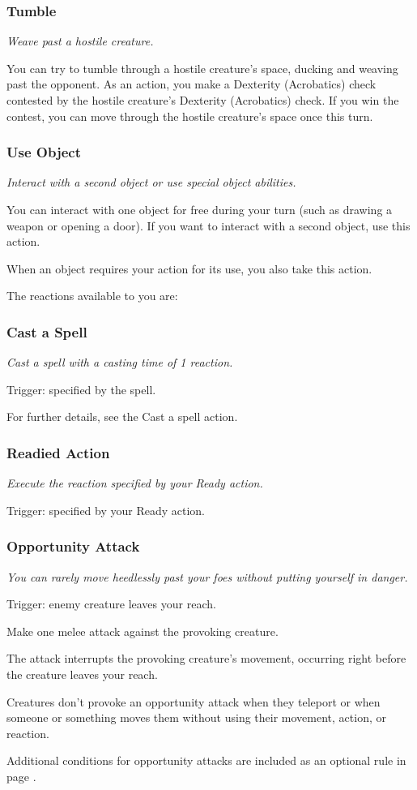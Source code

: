 \subsubsection{Tumble}
    \textit{Weave past a hostile creature.}

    You can try to tumble through a hostile creature's space, ducking and weaving past the opponent.
    As an action, you make a Dexterity (Acrobatics) check contested by the hostile creature's Dexterity (Acrobatics) check.
    If you win the contest, you can move through the hostile creature's space once this turn.
\subsubsection{Use Object}
    \textit{Interact with a second object or use special object abilities.}

    You can interact with one object for free during your turn (such as drawing a weapon or opening a door).
    If you want to interact with a second object, use this action.

    When an object requires your action for its use, you also take this action.

\hrulefill %

The reactions available to you are:
\subsubsection{Cast a Spell}
    \textit{Cast a spell with a casting time of 1 reaction.}

    Trigger: specified by the spell.

    For further details, see the Cast a spell action.
\subsubsection{Readied Action}
    \textit{Execute the reaction specified by your Ready action.}

    Trigger: specified by your Ready action.
\subsubsection{Opportunity Attack}
    \textit{You can rarely move heedlessly past your foes without putting yourself in danger.}

    Trigger: enemy creature leaves your reach.

    Make one melee attack against the provoking creature.

    The attack interrupts the provoking creature's movement, occurring right before the creature leaves your reach.

    Creatures don't provoke an opportunity attack when they teleport or when someone or something moves them without using their movement, action, or reaction.

    Additional conditions for opportunity attacks are included as an optional rule in page \pageref{rule::pportunityattacks}.
